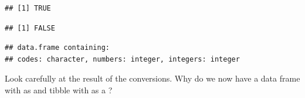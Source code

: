 \documentclass[krantz2]{krantz}\usepackage{knitr}%
\begin{document}
\begin{knitrout}\footnotesize
{}\color{fgcolor}\begin{kframe}
\begin{alltt}
 \hlkwb{<-} 
\end{alltt}
\begin{verbatim}
## [1] TRUE
\end{verbatim}
\begin{alltt}
\end{alltt}
\begin{verbatim}
## [1] FALSE
\end{verbatim}
\begin{alltt}
\end{alltt}
\begin{verbatim}
## data.frame containing:
## codes: character, numbers: integer, integers: integer
\end{verbatim}
\end{kframe}
\end{knitrout}

\begin{playground}
Look carefully at the result of the conversions. Why do we now have a data frame with  as  and tibble with  as a ?
\end{playground}
\end{document}
